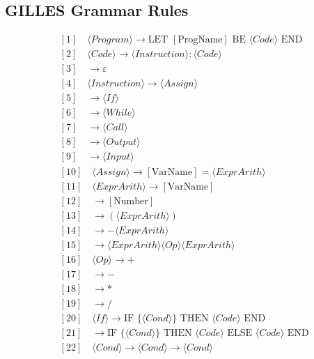 \subsection{GILLES Grammar Rules}
\begin{footnotesize}
	\begin{align*}
		&[1] \quad \langle Program \rangle \rightarrow \text{LET } [\text{ProgName}] \text{ BE } \langle Code \rangle \text{ END} \\
		&[2] \quad \langle Code \rangle \rightarrow \langle Instruction \rangle : \langle Code \rangle \\
		&[3] \quad \rightarrow \varepsilon \\
		&[4] \quad \langle Instruction \rangle \rightarrow \langle Assign \rangle \\
		&[5] \quad \rightarrow \langle If \rangle \\
		&[6] \quad \rightarrow \langle While \rangle \\
		&[7] \quad \rightarrow \langle Call \rangle \\
		&[8] \quad \rightarrow \langle Output \rangle \\
		&[9] \quad \rightarrow \langle Input \rangle \\
		&[10] \quad \langle Assign \rangle \rightarrow [\text{VarName}] = \langle ExprArith \rangle \\
		&[11] \quad \langle ExprArith \rangle \rightarrow [\text{VarName}] \\
		&[12] \quad \rightarrow [\text{Number}] \\
		&[13] \quad \rightarrow ( \langle ExprArith \rangle ) \\
		&[14] \quad \rightarrow - \langle ExprArith \rangle \\
		&[15] \quad \rightarrow \langle ExprArith \rangle \langle Op \rangle \langle ExprArith \rangle \\
		&[16] \quad \langle Op \rangle \rightarrow + \\
		&[17] \quad \rightarrow - \\
		&[18] \quad \rightarrow * \\
		&[19] \quad \rightarrow / \\
		&[20] \quad \langle If \rangle \rightarrow \text{IF } \{ \langle Cond \rangle \} \text{ THEN } \langle Code \rangle \text{ END} \\
		&[21] \quad \rightarrow \text{IF } \{ \langle Cond \rangle \} \text{ THEN } \langle Code \rangle \text{ ELSE } \langle Code \rangle \text{ END} \\
		&[22] \quad \langle Cond \rangle \rightarrow \langle Cond \rangle \rightarrow \langle Cond \rangle \\

\end{align*}
\end{footnotesize}
